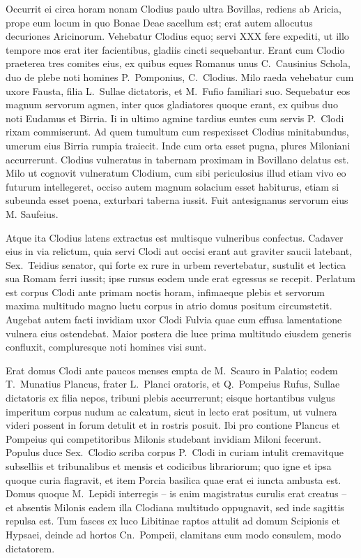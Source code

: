 Occurrit ei circa horam nonam Clodius paulo ultra Bovillas, rediens ab Aricia, prope eum locum in quo Bonae Deae sacellum est; erat autem allocutus decuriones Aricinorum. Vehebatur Clodius equo; servi XXX fere expediti, ut illo tempore mos erat iter facientibus, gladiis cincti sequebantur. Erant cum Clodio praeterea tres comites eius, ex quibus eques Romanus unus C.~Causinius Schola, duo de plebe noti homines P.~Pomponius, C.~Clodius. Milo raeda vehebatur cum uxore Fausta, filia L.~Sullae dictatoris, et M.~Fufio familiari suo. Sequebatur eos magnum servorum agmen, inter quos gladiatores quoque erant, ex quibus duo noti Eudamus et Birria. Ii in ultimo agmine tardius euntes cum servis P.~Clodi rixam commiserunt. Ad quem tumultum cum respexisset Clodius minitabundus, umerum eius Birria rumpia traiecit. Inde cum orta esset pugna, plures Miloniani accurrerunt. Clodius vulneratus in tabernam proximam in Bovillano delatus est. Milo ut cognovit vulneratum Clodium, cum sibi periculosius illud etiam vivo eo futurum intellegeret, occiso autem magnum solacium esset habiturus, etiam si subeunda esset poena, exturbari taberna iussit. Fuit antesignanus servorum eius M. Saufeius. 

Atque ita Clodius latens extractus est multisque vulneribus confectus. Cadaver eius in via relictum, quia servi Clodi aut occisi erant aut graviter saucii latebant, Sex.~Teidius senator, qui forte ex rure in urbem revertebatur, sustulit et lectica sua Romam ferri iussit; ipse rursus eodem unde erat egressus se recepit. Perlatum est corpus Clodi ante primam noctis horam, infimaeque plebis et servorum maxima multitudo magno luctu corpus in atrio domus positum circumstetit. Augebat autem facti invidiam uxor Clodi Fulvia quae cum effusa lamentatione vulnera eius ostendebat. Maior postera die luce prima multitudo eiusdem generis confluxit, compluresque noti homines visi sunt. 

Erat domus Clodi ante paucos menses empta de M.~Scauro in Palatio; eodem T.~Munatius Plancus, frater L.~Planci oratoris, et Q.~Pompeius Rufus, Sullae dictatoris ex filia nepos, tribuni plebis accurrerunt; eisque hortantibus vulgus imperitum corpus nudum ac calcatum, sicut in lecto erat positum, ut vulnera videri possent in forum detulit et in rostris posuit. Ibi pro contione Plancus et Pompeius qui competitoribus Milonis studebant invidiam Miloni fecerunt. Populus duce Sex.~Clodio scriba corpus P.~Clodi in curiam intulit cremavitque subselliis et tribunalibus et mensis et codicibus librariorum; quo igne et ipsa quoque curia flagravit, et item Porcia basilica quae erat ei iuncta ambusta est. Domus quoque M.~Lepidi interregis – is enim magistratus curulis erat creatus – et absentis Milonis eadem illa Clodiana multitudo oppugnavit, sed inde sagittis repulsa est. Tum fasces ex luco Libitinae raptos attulit ad domum Scipionis et Hypsaei, deinde ad hortos Cn.~Pompeii, clamitans eum modo consulem, modo dictatorem.

